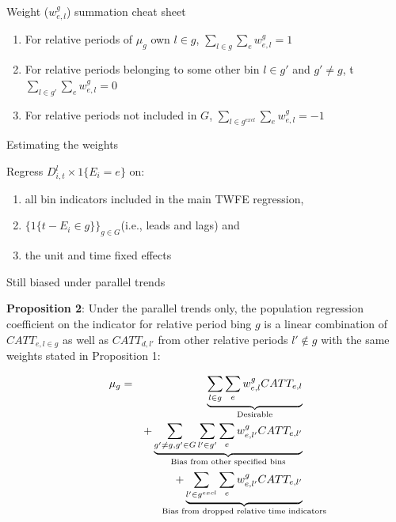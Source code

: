 \documentclass{beamer}
\begin{document}
\begin{frame}{Weight ($w^g_{e,l}$) summation cheat sheet}

\begin{enumerate}
\item For relative periods of $\mu_g$ own $l \in g$, $\sum_{l \in g}\sum_ew^g_{e,l}=1$
\item For relative periods belonging to some other bin $l\in g'$ and $g' \neq g$, t $\sum_{l \in g'}\sum_ew^g_{e,l} = 0$
\item For relative periods not included in $G$, $\sum_{l \in g^{excl}} \sum_e w^g_{e,l} = -1$
\end{enumerate}

\end{frame}




\begin{frame}{Estimating the weights}

Regress $D^l_{i,t} \times 1\{E_i=e \}$ on:

\begin{enumerate}
\item all bin indicators included in the main TWFE regression, 
\item $\{ 1\{ t-E_i \in g \} \}_{g \in G}$(i.e., leads and lags) and 
\item the unit and time fixed effects
\end{enumerate}

\end{frame}


\begin{frame}{Still biased under parallel trends}

\textbf{Proposition 2}: Under the parallel trends only, the population regression coefficient on the indicator for relative period bing $g$ is a linear combination of $CATT_{e,l \in g}$ as well as $CATT_{d,l'}$ from other relative periods $l' \notin g$ with the same weights stated in Proposition 1:

\begin{eqnarray*}
\mu_g &=& \underbrace{\sum_{l \in g} \sum_e w^g_{e,l} CATT_{e,l}}_{\mathclap{\text{Desirable}}} \\
&& + \underbrace{\sum_{g' \neq g, g' \in G} \sum_{l' \in g'} \sum_e w^g_{e,l'}  CATT_{e,l'}}_{\mathclap{\text{Bias from other specified bins}}} \\
&&+ \underbrace{\sum_{l' \in g^{excl}} \sum_e w^g_{e,l'} CATT_{e,l'}}_{\mathclap{\text{Bias from dropped relative time indicators}}}
\end{eqnarray*}



\end{frame}
\end{document}
